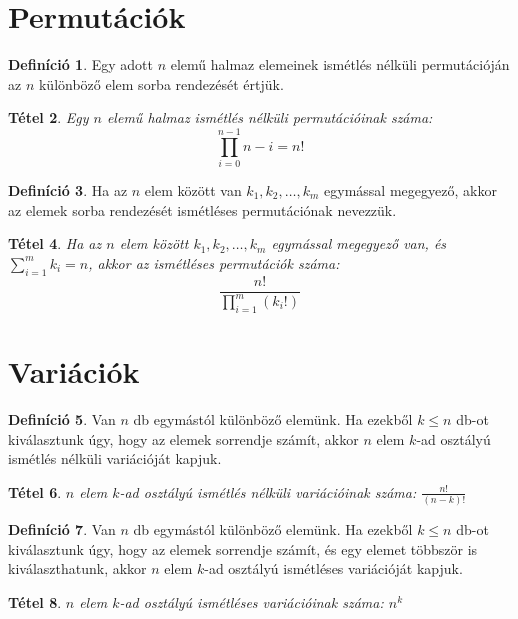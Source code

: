 \documentclass[twoside,12pt]{report}
\newtheorem{theorem}{Tétel}[section]
\theoremstyle{definition}
\newtheorem{definition}[theorem]{Definíció}
\begin{document}
\section{Permutációk}
	\begin{definition}
		Egy adott $n$ elemű halmaz elemeinek ismétlés nélküli permutációján az $n$ különböző elem sorba rendezését értjük.
	\end{definition}
	\begin{theorem}
		Egy $n$ elemű halmaz ismétlés nélküli permutációinak száma:
		\begin{equation*}
			\prod_{i=0}^{n-1}n-i=n!
		\end{equation*}
	\end{theorem}
	\begin{definition}
		Ha az $n$ elem között van $k_1,k_2,\dots,k_m$ egymással megegyező, akkor az elemek sorba rendezését ismétléses permutációnak nevezzük.
	\end{definition}
	\begin{theorem}
		Ha az $n$ elem között $k_1,k_2,\dots,k_m$ egymással megegyező van, és $\sum_{i=1}^{m}k_i=n$, akkor az ismétléses permutációk száma:
		\begin{equation*}
			\frac{n!}{\prod_{i=1}^{m}(k_i!)}
		\end{equation*}
	\end{theorem}
\section{Variációk}
	\begin{definition}
		Van $n$ db egymástól különböző elemünk. Ha ezekből $k\le n$ db-ot kiválasztunk úgy, hogy az elemek sorrendje számít, akkor $n$ elem $k$-ad osztályú ismétlés nélküli variációját kapjuk.
	\end{definition}
	\begin{theorem}
		$n$ elem $k$-ad osztályú ismétlés nélküli variációinak száma: $\frac{n!}{(n-k)!}$
	\end{theorem}
	\begin{definition}
		Van $n$ db egymástól különböző elemünk. Ha ezekből $k\le n$ db-ot kiválasztunk úgy, hogy az elemek sorrendje számít, és egy elemet többször is kiválaszthatunk, akkor $n$ elem $k$-ad osztályú ismétléses variációját kapjuk.
	\end{definition}
	\begin{theorem}
		$n$ elem $k$-ad osztályú ismétléses variációinak száma: $n^k$
	\end{theorem}
\end{document}
